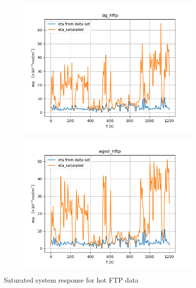 \begin{figure}[H]
        \begin{minipage}{0.49\textwidth}
                \begin{figure}[H]
                        \centering
                        \includegraphics[width=\textwidth]{./figs/14_figs/bounded_eta_plots/eta_bounds_dg_hftp.png}
                \end{figure}
        \end{minipage}
        \begin{minipage}{0.49\textwidth}
                \begin{figure}[H]
                        \centering
                        \includegraphics[width=\textwidth]{./figs/14_figs/bounded_eta_plots/eta_bounds_aged_hftp.png}
                \end{figure}
        \end{minipage}
        \caption{Saturated system response for hot FTP data}
\end{figure}

